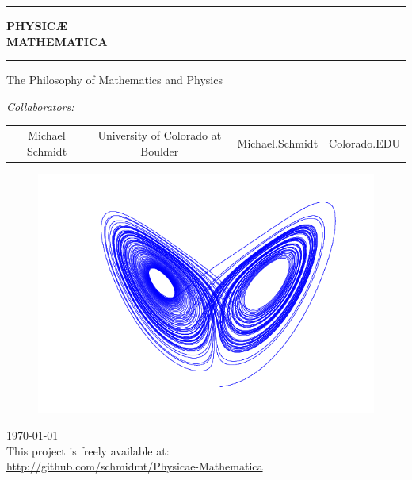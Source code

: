 \begin{titlepage}
\begin{center}
\hrule
{ \huge \bfseries PHYSIC\AE\\  MATHEMATICA}\\[0.5cm]
\hrule
The Philosophy of Mathematics and Physics

\emph{Collaborators:}\\
\begin{tabular}[center]{ccr@{@}l}
    Michael Schmidt & University of Colorado at Boulder & Michael.Schmidt & Colorado.EDU\\
\end{tabular}

\begin{figure}[!h]
    \centering
	\includegraphics[scale=0.60]{./attractor.png}
\end{figure}

\vfill
{\large \today}\\

This project is freely available at:\\
\url{http://github.com/schmidmt/Physicae-Mathematica}

\end{center}

\vfill


\end{titlepage}

